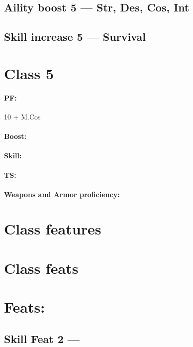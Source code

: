 \documentclass[
a4paper,
twoside,
11pt, 
openany,
]{memoir}
\begin{document}
\begin{multicols*}{2}
	\subsection*{Aility boost 5 — Str, Des, Cos, Int}
	
	\subsection*{Skill increase 5 — Survival}
	
	
	\section*{Class 5}
	\paragraph{PF:} 10 + M.Cos
	\paragraph{Boost:} 
	\paragraph{Skill:} 
	\paragraph{TS:} 
	\paragraph{Weapons and Armor proficiency:} 
	
	\section*{Class features}
	
	\section*{Class feats}
	
	
	\section*{Feats:}
	\subsection*{Skill Feat 2 — }
	
	
\end{multicols*}
\end{document}
